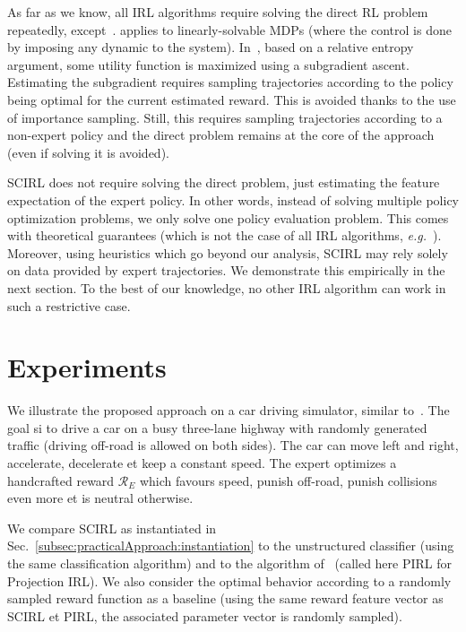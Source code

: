 \documentclass[english,utf8]{./hermes-journal}
\newcommand{\R}{\mathcal{R}}
\begin{document}
As far as we know, all IRL algorithms require solving the direct RL
problem repeatedly, except~\cite{Dvij:2010,boularias:2011}.
\cite{Dvij:2010} applies to linearly-solvable MDPs (where the
control is done by imposing any dynamic to the system).
In~\cite{boularias:2011}, based on a relative entropy argument, some
utility function is maximized using a subgradient ascent. Estimating
the subgradient requires sampling trajectories according to the
policy being optimal for the current estimated reward. This is
avoided thanks to the use of importance sampling. Still, this
requires sampling trajectories according to a non-expert policy and
the direct problem remains at the core of the approach (even if
solving it is avoided).

SCIRL does not require solving the direct problem, just estimating
the feature expectation of the expert policy. In other words,
instead of solving multiple policy optimization problems, we only
solve one policy evaluation problem. This comes with theoretical
guarantees (which is not the case of all IRL algorithms,
\textit{e.g.}~\cite{boularias:2011}). Moreover, using heuristics
which go beyond our analysis, SCIRL may rely solely on data provided
by expert trajectories. We demonstrate this empirically in the next
section. To the best of our knowledge, no other IRL algorithm can
work in such a restrictive case.


\section{Experiments}
\label{sec:experiments}

We illustrate the proposed approach on a car driving simulator,
similar to~\cite{Abbeel:2004,Syed:2008:game}. The goal si to drive a
car on a busy three-lane highway with randomly generated traffic
(driving off-road is allowed on both sides). The car can move left
and right, accelerate, decelerate et keep a constant speed. The
expert optimizes a handcrafted reward $\R_E$ which favours speed,
punish off-road, punish collisions even more  et is neutral
otherwise.

We compare SCIRL as instantiated in
Sec.~\ref{subsec:practicalApproach:instantiation} to the
unstructured classifier (using the same classification algorithm)
and to the algorithm of~\cite{Abbeel:2004} (called here PIRL for
Projection IRL). We also consider the optimal behavior according to
a randomly sampled reward function as a baseline (using the same
reward feature vector as SCIRL et PIRL, the associated parameter
vector is randomly sampled).
\end{document}
